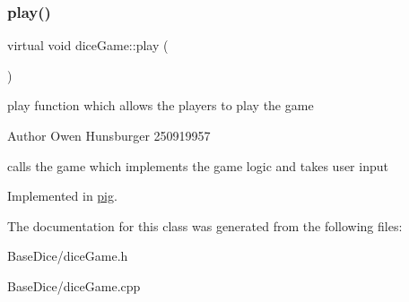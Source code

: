 \subsubsection{\texorpdfstring{play()}{play()}}
{\footnotesize\ttfamily virtual void dice\+Game\+::play (\begin{DoxyParamCaption}{ }\end{DoxyParamCaption})\hspace{0.3cm}{\ttfamily [pure virtual]}}



play function which allows the players to play the game 

\begin{DoxyAuthor}{Author}
Owen Hunsburger 250919957
\end{DoxyAuthor}
calls the game which implements the game logic and takes user input 

Implemented in \hyperlink{classpig_a83fd8571e2f33ec33f6fafd7efa96571}{pig}.



The documentation for this class was generated from the following files\+:\begin{DoxyCompactItemize}
\item 
Base\+Dice/dice\+Game.\+h\item 
Base\+Dice/dice\+Game.\+cpp\end{DoxyCompactItemize}
